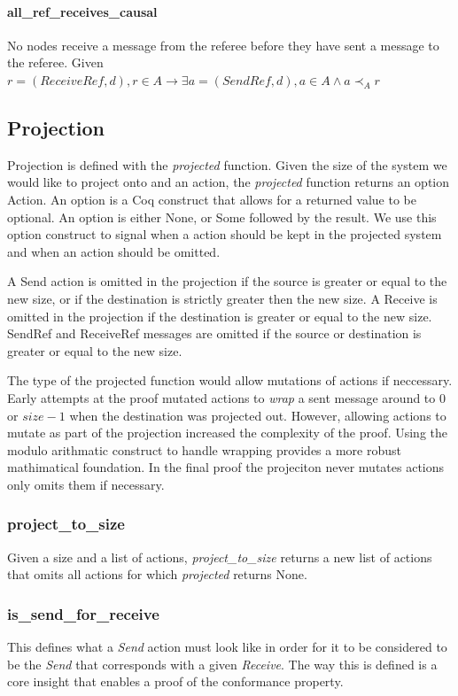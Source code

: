 \documentclass[runningheads]{llncs}
\newcommand{\happensbefore}{\prec_A}
\begin{document}
\paragraph{all\_ref\_receives\_causal} No nodes receive a message from the referee before they have sent a message to the referee. Given $r = (ReceiveRef, d), r \in A \longrightarrow \exists a = (SendRef, d), a \in A \wedge a \happensbefore r$

\subsection{Projection}
Projection is defined with the \emph{projected} function. Given the size of the system we would like to project onto and an action, the \emph{projected} function returns an option Action. An option is a Coq construct that allows for a returned value to be optional. An option is either None, or Some followed by the result. We use this option construct to signal when a action should be kept in the projected system and when an action should be omitted. 

A Send action is omitted in the projection if the source is greater or equal to the new size, or if the destination is strictly greater then the new size. A Receive is omitted in the projection if the destination is greater or equal to the new size. SendRef and ReceiveRef messages are omitted if the source or destination is greater or equal to the new size.  

The type of the projected function would allow mutations of actions if neccessary. Early attempts at the proof mutated actions to \emph{wrap} a sent message around to $0$ or $size-1$ when the destination was projected out. However, allowing actions to mutate as part of the projection increased the complexity of the proof. Using the modulo arithmatic construct to handle wrapping provides a more robust mathimatical foundation. In the final proof the projeciton never mutates actions only omits them if necessary. 

\subsubsection{project\_to\_size} 
Given a size and a list of actions, \emph{project\_to\_size} returns a new list of actions that omits all actions for which \emph{projected} returns None. 

\subsubsection{is\_send\_for\_receive}
This defines what a \emph{Send} action must look like in order for it to be considered to be the \emph{Send} that corresponds with a given \emph{Receive}. The way this is defined is a core insight that enables a proof of the conformance property. 
\end{document}
